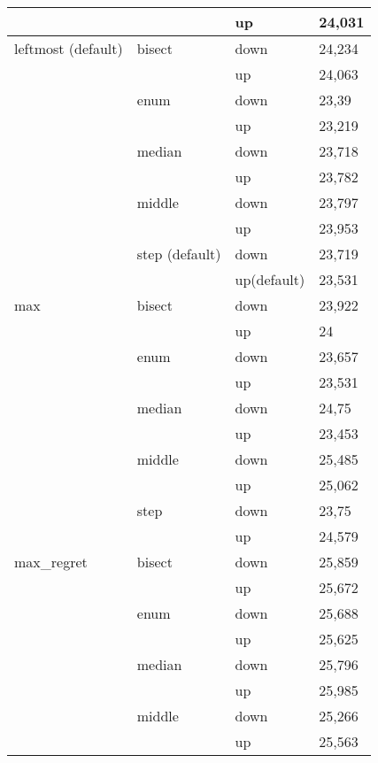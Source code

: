 \begin{longtable}{llll}
          &       & up    & 24,031 \\ \hline
    \multicolumn{1}{l}{leftmost (default)} & \multicolumn{1}{l}{bisect} & down  & 24,234 \\
          &       & up    & 24,063 \\
          & \multicolumn{1}{l}{enum} & down  & 23,39 \\
          &       & up    & 23,219 \\
          & \multicolumn{1}{l}{median} & down  & 23,718 \\
          &       & up    & 23,782 \\
          & \multicolumn{1}{l}{middle} & down  & 23,797 \\
          &       & up    & 23,953 \\
          & \multicolumn{1}{l}{step (default)} & down  & 23,719 \\
          &       & up(default) & 23,531 \\ \hline
    \multicolumn{1}{l}{max} & \multicolumn{1}{l}{bisect} & down  & 23,922 \\
          &       & up    & 24 \\
          & \multicolumn{1}{l}{enum} & down  & 23,657 \\
          &       & up    & 23,531 \\
          & \multicolumn{1}{l}{median} & down  & 24,75 \\
          &       & up    & 23,453 \\
          & \multicolumn{1}{l}{middle} & down  & 25,485 \\
          &       & up    & 25,062 \\
          & \multicolumn{1}{l}{step} & down  & 23,75 \\
          &       & up    & 24,579 \\ \hline
    \multicolumn{1}{l}{max\_regret} & \multicolumn{1}{l}{bisect} & down  & 25,859 \\
          &       & up    & 25,672 \\
          & \multicolumn{1}{l}{enum} & down  & 25,688 \\
          &       & up    & 25,625 \\
          & \multicolumn{1}{l}{median} & down  & 25,796 \\
          &       & up    & 25,985 \\
          & \multicolumn{1}{l}{middle} & down  & 25,266 \\
          &       & up    & 25,563 \\

\end{longtable}
